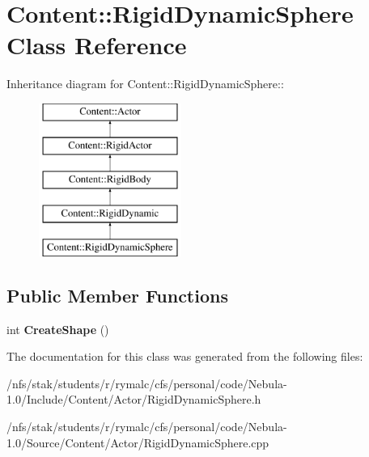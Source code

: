 \hypertarget{classContent_1_1RigidDynamicSphere}{
\section{Content::RigidDynamicSphere Class Reference}
\label{classContent_1_1RigidDynamicSphere}
}
Inheritance diagram for Content::RigidDynamicSphere::\begin{figure}[H]
\begin{center}
\leavevmode
\includegraphics[height=5cm]{classContent_1_1RigidDynamicSphere}
\end{center}
\end{figure}
\subsection*{Public Member Functions}
\begin{DoxyCompactItemize}
\item 
\hypertarget{classContent_1_1RigidDynamicSphere_a4345d47ada7567eb36487b593a6d742c}{
int {\bfseries CreateShape} ()}
\label{classContent_1_1RigidDynamicSphere_a4345d47ada7567eb36487b593a6d742c}

\end{DoxyCompactItemize}


The documentation for this class was generated from the following files:\begin{DoxyCompactItemize}
\item 
/nfs/stak/students/r/rymalc/cfs/personal/code/Nebula-\/1.0/Include/Content/Actor/RigidDynamicSphere.h\item 
/nfs/stak/students/r/rymalc/cfs/personal/code/Nebula-\/1.0/Source/Content/Actor/RigidDynamicSphere.cpp\end{DoxyCompactItemize}
